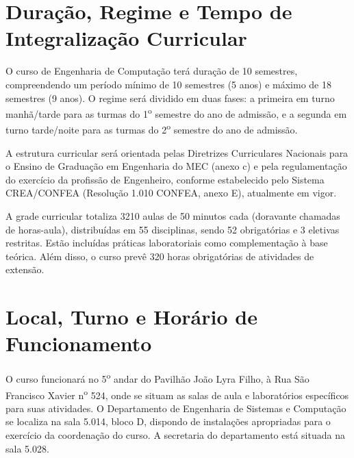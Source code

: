 \section{Duração, Regime e Tempo de Integralização Curricular}

O curso de Engenharia de Computação terá duração de 10 semestres, compreendendo um período mínimo de 10 semestres (5 anos) e máximo de 18 semestres (9 anos). O regime será dividido em duas fases: a primeira em turno manhã/tarde para as turmas do 1\textsuperscript{o} semestre do ano de admissão, e a segunda em turno tarde/noite para as turmas do 2\textsuperscript{o} semestre do ano de admissão.

A estrutura curricular será orientada pelas Diretrizes Curriculares Nacionais para o Ensino de Graduação em Engenharia do MEC (anexo c) e pela regulamentação do exercício da profissão de Engenheiro, conforme estabelecido pelo Sistema CREA/CONFEA (Resolução 1.010 CONFEA, anexo E), atualmente em vigor.

A grade curricular totaliza 3210 aulas de 50 minutos cada (doravante chamadas de horas-aula), distribuídas em 55 disciplinas, sendo 52 obrigatórias e 3 eletivas restritas. Estão incluídas práticas laboratoriais como complementação à base teórica. Além disso, o curso prevê 320 horas obrigatórias de atividades de extensão.
  


\section{Local, Turno e Horário de Funcionamento}

O curso funcionará no 5\textsuperscript{o} andar do Pavilhão João Lyra Filho, à Rua São Francisco Xavier n\textsuperscript{o} 524, onde se situam as salas de aula e laboratórios específicos para suas atividades. O Departamento de Engenharia de Sistemas e Computação se localiza na sala 5.014, bloco D, dispondo de instalações apropriadas para o exercício da coordenação do curso. A secretaria do departamento está situada na sala 5.028.


